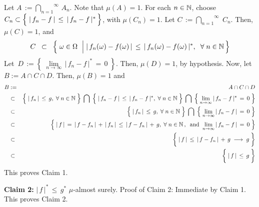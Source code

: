 Let \;$A \,:= \overset{\infty}{\underset{n=1}{\bigcap}}\,A_{n}$.
Note that $\mu(A) = 1$.
For each $n\in\mathbb{N}$, choose
\,$C_{n} \subset \left\{\;\vert\,f_{n} - f\,\vert \,\overset{{\color{white}.}}{\leq}\, \vert\,f_{n} - f\,\vert^{*}\,\right\}$,
with $\mu(C_{n}) = 1$. Let $C \,:= \overset{\infty}{\underset{n=1}{\bigcap}}\;C_{n}$. Then, $\mu(C) = 1$, and
\begin{equation*}
C \;\;\subset\;\;
	\left\{\;
	\omega \in \Omega
	\;\,\left\vert\;
	\vert\,f_{n}(\omega) - f(\omega)\,\vert \,\overset{{\color{white}.}}{\leq}\, \vert\,f_{n}(\omega) - f(\omega)\,\vert^{*},
	\right.
	\;\forall\;n\in\N
	\,\right\}
\end{equation*}
Let \,$D \,:= \left\{\;\underset{n\rightarrow\infty}{\lim}\,\vert\,f_{n} - f\,\vert^{*}\,=\,0\;\right\}$.
Then, $\mu(D) = 1$, by hypothesis.
Now, let $B := A \cap C \cap D$. Then, $\mu(B) = 1$ and 
\begin{eqnarray*}
B
&:=&
	A \cap C \cap D
\\
& \subset &
	\left\{\;\vert\,f_{n}\,\vert \,\overset{{\color{white}.}}{\leq}\, g,\;\forall\;n\in\N\;\right\}
	\;\bigcap\;
	\left\{\;\vert\,f_{n} - f\,\vert \,\overset{{\color{white}.}}{\leq}\, \vert\,f_{n} - f\,\vert^{*},\;\forall\;n\in\N\;\right\}
	\;\bigcap\;
	\left\{\;\underset{n\rightarrow\infty}{\lim}\,\vert\,f_{n} - f\,\vert^{*}\,=\,0\;\right\}
\\
& \subset &
	\left\{\;\vert\,f_{n}\,\vert \,\overset{{\color{white}.}}{\leq}\, g,\;\forall\;n\in\N\;\right\}
	\;\bigcap\;
	\left\{\;\underset{n\rightarrow\infty}{\lim}\,\vert\,f_{n} - f\,\vert\,=\,0\;\right\}
\\
& \subset &
	\left\{\;
		\vert\,f\,\vert
		\,\overset{{\color{white}+}}{=}\,
		\vert\,f - f_{n}\,\vert\,+\,\vert\,f_{n}\,\vert
		\,\leq\,
		\vert\,f - f_{n}\,\vert\,+\,g,
		\;\forall\;n\in\N\,,
		\;\;\textnormal{and}\;\;
		\underset{n\rightarrow\infty}{\lim}\,\vert\,f_{n} - f\,\vert\,=\,0
	\;\right\}
\\
& \subset &
	\left\{\;
		\vert\,f\,\vert
		\,\overset{{\color{white}+}}{\leq}\,
		\vert\,f - f_{n}\,\vert\,+\,g
		\;\longrightarrow\;
		g
	\;\right\}
\\
& \subset &
	\left\{\;
		\vert\,f\,\vert
		\,\overset{{\color{white}+}}{\leq}\,
		g
	\;\right\}
\end{eqnarray*}
This proves Claim 1.

\vskip 0.5cm
\noindent
\textbf{Claim 2:}\quad
$\vert\,f\,\vert^{*} \,\leq\, g^{*}$\; $\mu$-almost surely.
\vskip 0.1cm
\noindent
Proof of Claim 2:\quad
Immediate by Claim 1.
This proves Claim 2.

